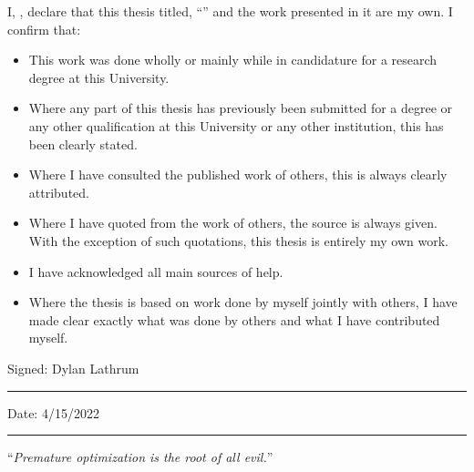 \documentclass[
11pt, %
english, %
singlespacing, %
headsepline, %
]{MastersDoctoralThesis} %
\begin{document}

\begin{declaration}
	\addchaptertocentry{\authorshipname} %
	\noindent I, \authorname, declare that this thesis titled, \enquote{\ttitle} and the work presented in it are my own. I confirm that:

	\begin{itemize}
		\item This work was done wholly or mainly while in candidature for a research degree at this University.
		\item Where any part of this thesis has previously been submitted for a degree or any other qualification at this University or any other institution, this has been clearly stated.
		\item Where I have consulted the published work of others, this is always clearly attributed.
		\item Where I have quoted from the work of others, the source is always given. With the exception of such quotations, this thesis is entirely my own work.
		\item I have acknowledged all main sources of help.
		\item Where the thesis is based on work done by myself jointly with others, I have made clear exactly what was done by others and what I have contributed myself.\\
	\end{itemize}

	\noindent Signed: Dylan Lathrum\\
	\rule[0.5em]{25em}{0.5pt} %

	\noindent Date: 4/15/2022\\
	\rule[0.5em]{25em}{0.5pt} %
\end{declaration}

\cleardoublepage


\vspace*{0.2\textheight}

\noindent\enquote{\itshape Premature optimization is the root of all evil.}\bigbreak
\end{document}
